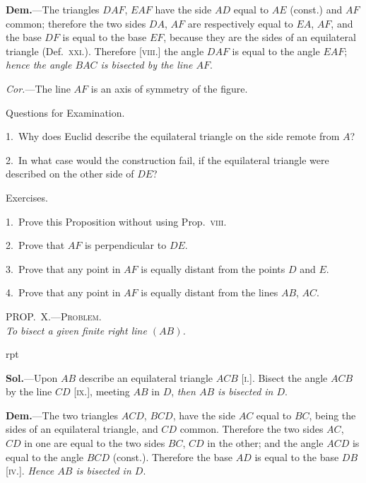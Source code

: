 \documentclass[oneside]{book}
\newcounter{wrapwidth}
\newcommand\myprop[2]{
\bigskip\Needspace*{4\baselineskip}\begin{center}\textsc{#1}\\\medskip\emph{#2}\par\end{center}
}
\newcommand\exhead[1]{
\Needspace*{5\baselineskip}\begin{center}
\textsf{#1}
\end{center}
}
\newcommand\imgflow[3]{
\setcounter{wrapwidth}{#1}

\begin{wrapfigure}[#2]{r}{\value{wrapwidth}pt}
\begin{center}
\vspace{-0.3in}

\end{center}
\end{wrapfigure}
}
\begin{document}
\textbf{Dem.}---The triangles $DAF$,
$EAF$ have the side $AD$ equal
to $AE$ (const.) and $AF$ common;
therefore the two sides $DA$, $AF$
are respectively equal to $EA$,
$AF$, and the base $DF$ is equal to
the base $EF$, because they are the sides of an equilateral
triangle (Def.~\textsc{xxi.}). Therefore [\textsc{viii.}] the
angle $DAF$ is equal to the angle $EAF$; \emph{hence the angle
$BAC$ is bisected by the line $AF$}.

\emph{Cor.}---The line $AF$ is an axis of symmetry of the
figure.

\exhead{Questions for Examination.}

\begin{footnotesize}
1.~Why does Euclid describe the equilateral triangle on the
side remote from $A$?

2.~In what case would the construction fail, if the equilateral
triangle were described on the other side of $DE$?
\par\end{footnotesize}

\exhead{Exercises.}

\begin{footnotesize}
1.~Prove this Proposition without using Prop.~\textsc{viii.}

2.~Prove that $AF$ is perpendicular to $DE$.

3.~Prove that any point in $AF$ is equally distant from the
points $D$ and $E$.

4.~Prove that any point in $AF$ is equally distant from the lines
$AB$, $AC$.
\par\end{footnotesize}




\myprop{PROP\@.~X.---Problem.}{To bisect a given finite right line $(AB)$.}


\imgflow{100}{9}{f025}

\textbf{Sol.}---Upon $AB$ describe an equilateral triangle $ACB$
[\textsc{i.}]. 
Bisect the angle $ACB$ by the
line $CD$ [\textsc{ix.}], meeting $AB$ in $D$, \emph{then
$AB$ is bisected in $D$}.

\textbf{Dem.}---The two triangles $ACD$,
$BCD$, have the side $AC$ equal to $BC$,
being the sides of an equilateral
triangle, and $CD$ common. Therefore
the two sides $AC$, $CD$ in one
are equal to the two sides $BC$, $CD$ in the other; and the
angle $ACD$ is equal to the angle $BCD$ (const.). Therefore
the base $AD$ is equal to the base $DB$ [\textsc{iv.}]. \emph{Hence
$AB$ is bisected in $D$}.
\end{document}
